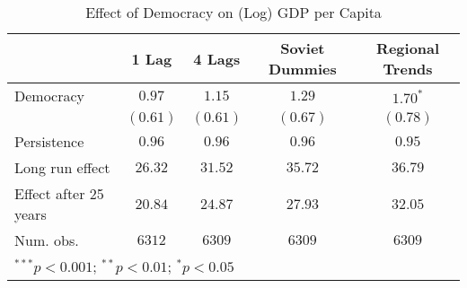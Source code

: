 
\begin{table}
\begin{center}
\begin{tabular}{l c c c c}
\hline
 & 1 Lag & 4 Lags & Soviet Dummies & Regional Trends \\
\hline
Democracy             & $0.97$   & $1.15$   & $1.29$   & $1.70^{*}$ \\
                      & $(0.61)$ & $(0.61)$ & $(0.67)$ & $(0.78)$   \\
\hline
Persistence           & $0.96$   & $0.96$   & $0.96$   & $0.95$     \\
Long run effect       & $26.32$  & $31.52$  & $35.72$  & $36.79$    \\
Effect after 25 years & $20.84$  & $24.87$  & $27.93$  & $32.05$    \\
Num. obs.             & $6312$   & $6309$   & $6309$   & $6309$     \\
\hline
\multicolumn{5}{l}{\scriptsize{$^{***}p<0.001$; $^{**}p<0.01$; $^{*}p<0.05$}}
\end{tabular}
\caption{Effect of Democracy on (Log) GDP per Capita}
\label{table:coefficients}
\end{center}
\end{table}
